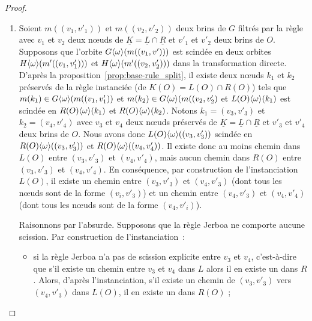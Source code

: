 \begin{proof}
\begin{enumerate}
\begin{itemize}
			      \item si au contraire $(v_1, v'_1)$ et $(v_2, v'_2)$ sont dans la même
			            $\orbit{\omega}$-orbites de $R(O)$ (car il existe un chemin $e_1 e_2 ... e_l$ de $O$
			            de source $v'_1$ et de cible $v'_2$ qui ne comprend pas l'étiquette $j$, ce
			            chemin est réécrit en un chemin $(w, e_1) (w,e_2) ... (w, e_l)$ de $R(O)$ dont
			            toutes les étiquettes sont dans $\orbit{\omega}$). D'après la proposition
			            \ref{prop:base-rule-modify}, on en déduit que $G\orbit{\omega}(m((v_1, v'_1))$ est modifiée par la transformation directe $G \xlongrightarrow{r, \underline{m}} H$. %
		      \end{itemize}
		\item
		      Soient $m((v_1,v'_1))$ et $m((v_2,v'_2))$ deux brins de $G$ filtrés par la règle avec $v_1$ et $v_2$ deux n\oe uds de $\underline{K} = \underline{L} \cap \underline{R}$ et $v'_1$ et $v'_2$ deux brins de $O$. %
		      Supposons que l'orbite $G\langle\omega\rangle(m((v_1,v')))$ est scindée en deux orbites $H\langle\omega\rangle(m'((v_1, v'_1)))$ et $H\langle\omega\rangle(m'((v_2, v'_2)))$ dans la transformation directe. %
		      D'après la proposition~\ref{prop:base-rule_split}, il existe deux n\oe uds $k_1$ et $k_2$ préservés de la règle instanciée (de $K(O) = L(O) \cap R(O)$) tels que $m(k_1) \in G\langle\omega\rangle(m((v_1, v'_1))$ et $m(k_2) \in G\langle\omega\rangle(m((v_2,v'_2)$ et $L(O)\langle\omega\rangle(k_1)$ est scindée en $R(O)\langle\omega\rangle(k_1)$ et $R(O)\langle\omega\rangle(k_2)$. %
		      Notons $k_1 = (v_3, v'_3)$ et $k_2 = (v_4, v'_4)$ avec $v_3$ et $v_4$ deux n\oe uds préservés de $\underline{K} = \underline{L} \cap \underline{R}$ et $v'_3$ et $v'_4$ deux brins de $O$. %
		      Nous avons donc $L(O)\langle\omega\rangle((v_3,v'_3))$ scindée en $R(O)\langle\omega\rangle((v_3, v'_3))$ et $R(O)\langle\omega\rangle((v_4, v'_4))$. %
		      Il existe donc au moins chemin dans $L(O)$ entre $(v_3, v'_3)$ et $(v_4, v'_4)$, mais aucun chemin dans $R(O)$ entre $(v_3, v'_3)$ et $(v_4, v'_4)$. %
		      En conséquence, par construction de l'instanciation $L(O)$, il existe un chemin entre $(v_3, v'_3)$ et $(v_4, v'_3)$ (dont tous les n\oe uds sont de la forme $(v_i, v'_3)$) et un chemin entre $(v_4, v'_3)$ et $(v_4, v'_4)$ (dont tous les n\oe uds sont de la forme $(v_4, v'_i)$). %

		      Raisonnons par l'absurde. %
		      Supposons que la règle Jerboa ne comporte aucune scission. %
		      Par construction de l'instanciation~:
		      \begin{itemize}
			      \item si la règle Jerboa n'a pas de scission explicite entre $v_3$ et $v_4$, c'est-à-dire que s'il existe un chemin entre $v_3$ et $v_4$ dans $L$ alors il en existe un dans $R$. %
			            Alors, d'après l'instanciation, s'il existe un chemin de $(v_3, v'_3)$ vers $(v_4, v'_3)$ dans $L(O)$, il en existe un dans $R(O)$ ; %


\end{itemize}
\end{enumerate}
\end{proof}
